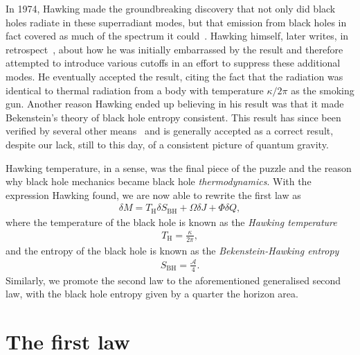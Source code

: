 \documentclass[
twoside,
openright,
frontopenright,
]{dmathesis}
\begin{document}
In 1974, Hawking made the groundbreaking discovery that not only did black holes
radiate in these superradiant modes, but that emission from black holes in fact
covered as much of the spectrum it
could~\cite{Hawking:1974rv,Hawking:1974sw}. Hawking himself, later writes, in
retrospect~\cite{10.2307/24953849}, about how he was initially embarrassed by
the result and therefore attempted to introduce various cutoffs in an effort to
suppress these additional modes. He eventually accepted the result, citing the
fact that the radiation was identical to thermal radiation from a body with
temperature $\kappa/2\pi$ as the smoking gun. Another reason Hawking ended up
believing in his result was that it made Bekenstein's theory of black hole
entropy consistent. This result has since been verified by several other
means~\cite{Bekenstein:1975tw,DeWitt:1975ys,Parker:1975jm,Hawking:1974sw,Wald:1975kc,Gerlach:1976ji,Hartle:1976tp,Unruh:1976db,Boulware:1975fe,Davies:1976ei,Hawking:1976de}
and is generally accepted as a correct result, despite our lack, still to this
day, of a consistent picture of quantum gravity.

Hawking temperature, in a sense, was the final piece of the puzzle and the
reason why black hole mechanics became black hole \emph{thermodynamics}. With the
expression Hawking found, we are now able to rewrite the first law as
\begin{align}
  \label{eq:firstlaw}
  \delta M = T_\mathrm{H} \delta S_\mathrm{BH} + \Omega \delta J + \Phi \delta Q,
\end{align}
where the temperature of the black hole is known as the \emph{Hawking
  temperature}
\begin{align}
  \label{eq:hawkingtemperature}
  T_\mathrm{H}=\frac{\kappa}{2\pi},
\end{align}
and the entropy of the black hole is known as the \emph{Bekenstein-Hawking
  entropy}
\begin{align}
  \label{eq:BHentropy}
  S_\mathrm{BH}=\frac{\mathcal{A}}{4}.
\end{align}
Similarly, we promote the second law to the aforementioned generalised second
law, with the black hole entropy given by a quarter the horizon area.

\section{The first law}
\label{sec:firstlaw}
\end{document}
